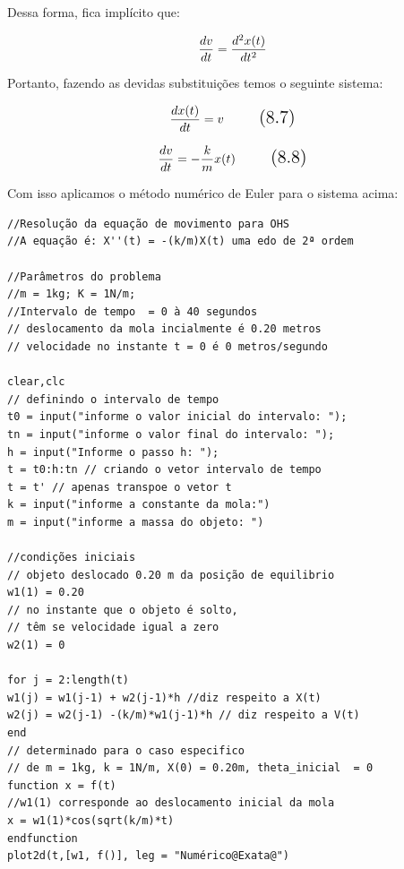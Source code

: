 Dessa forma, fica implícito que:

\[\Large \frac{dv}{dt} = \frac{d^2x(t)}{dt^2}\]

Portanto, fazendo as devidas substituições temos o seguinte sistema:

\begin{equation}
\Large \frac{dx(t)}{dt} = v
\tag{8.7}
\end{equation}

\begin{equation}
\Large \frac{dv}{dt} = -\frac{k}{m}x(t)
\tag{8.8}
\end{equation}

Com isso aplicamos o método numérico de Euler para o sistema acima:

\begin{verbatim}
//Resolução da equação de movimento para OHS
//A equação é: X''(t) = -(k/m)X(t) uma edo de 2ª ordem

//Parâmetros do problema
//m = 1kg; K = 1N/m; 
//Intervalo de tempo  = 0 à 40 segundos 
// deslocamento da mola incialmente é 0.20 metros
// velocidade no instante t = 0 é 0 metros/segundo

clear,clc
// definindo o intervalo de tempo
t0 = input("informe o valor inicial do intervalo: ");
tn = input("informe o valor final do intervalo: ");
h = input("Informe o passo h: ");
t = t0:h:tn // criando o vetor intervalo de tempo
t = t' // apenas transpoe o vetor t
k = input("informe a constante da mola:")
m = input("informe a massa do objeto: ")

//condições iniciais
// objeto deslocado 0.20 m da posição de equilibrio
w1(1) = 0.20 
// no instante que o objeto é solto, 
// têm se velocidade igual a zero
w2(1) = 0 

for j = 2:length(t)
w1(j) = w1(j-1) + w2(j-1)*h //diz respeito a X(t)
w2(j) = w2(j-1) -(k/m)*w1(j-1)*h // diz respeito a V(t)
end
// determinado para o caso especifico 
// de m = 1kg, k = 1N/m, X(0) = 0.20m, theta_inicial  = 0
function x = f(t)
//w1(1) corresponde ao deslocamento inicial da mola
x = w1(1)*cos(sqrt(k/m)*t) 
endfunction
plot2d(t,[w1, f()], leg = "Numérico@Exata@")
\end{verbatim}